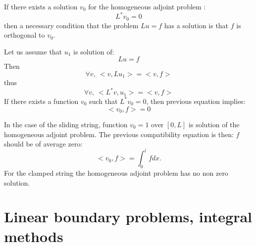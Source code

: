 \documentclass[12pt]{book}
\begin{document}
\begin{thm}
If there exists  a solution $v_0$ for the homogeneous adjoint problem :
\begin{equation}
L^*v_0=0
\end{equation}
then a necessary condition that the problem $Lu=f$ has a solution is that $f$
is orthogonal to  $v_0$. 
\end{thm}
\begin{pf}
Let us assume that $u_1$ is solution of:
\begin{equation}
Lu=f
\end{equation}
Then
\begin{equation}
\forall v,\ <v,Lu_1>=<v,f>
\end{equation}
thus 
\begin{equation}
\forall v,\ <L^*v,u_1>=<v,f>
\end{equation}
If there exists a function $v_0$ such that $L^*v_0=0$, then previous equation
implies: 
\begin{equation}
<v_0,f>=0
\end{equation}
\end{pf}

\begin{exmp}
In the case of the sliding string, function $v_0=1$ over $[0,L]$ is solution
of the homogeneous adjoint problem. The previous compatibility equation is then: $f$ should
be of average zero:
\begin{equation}
<v_0,f>=\int_0^lf dx.
\end{equation}
For the clamped string the homogeneous adjoint problem has no non zero
solution. 

\end{exmp}


\section{Linear boundary problems, integral methods}\label{chapmethint}
\end{document}
